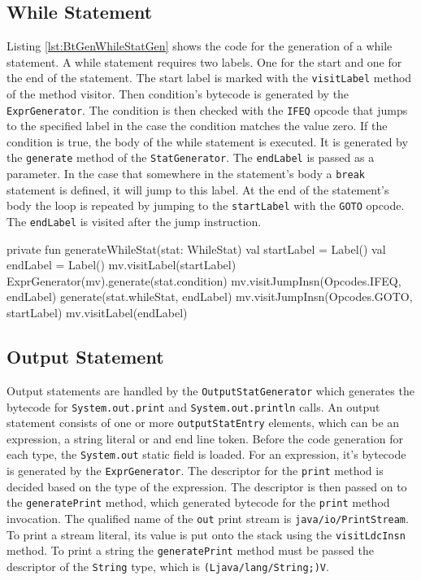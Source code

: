 \subsection{While Statement}

Listing \ref{lst:BtGenWhileStatGen} shows the code for the generation of a while statement. A while statement requires two labels. One for the start and one for the end of the statement. The start label is marked with the \verb|visitLabel| method of the method visitor. Then condition's bytecode is generated by the \verb|ExprGenerator|. The condition is then checked with the \verb|IFEQ| opcode that jumps to the specified label in the case the condition matches the value zero. If the condition is true, the body of the while statement is executed. It is generated by the \verb|generate| method of the \verb|StatGenerator|. The \verb|endLabel| is passed as a parameter. In the case that somewhere in the statement's body a \verb|break| statement is defined, it will jump to this label. At the end of the statement's body the loop is repeated by jumping to the \verb|startLabel| with the \verb|GOTO| opcode. The \verb|endLabel| is visited after the jump instruction. 


\begin{KotlinCode}[float,numbers=none,caption=Implementation of the \texttt{generateInputStat} method of the \texttt{StatGenerator}., label=lst:BtGenWhileStatGen]
private fun generateWhileStat(stat: WhileStat) {
    val startLabel = Label()
    val endLabel = Label()
    mv.visitLabel(startLabel)
    ExprGenerator(mv).generate(stat.condition)
    mv.visitJumpInsn(Opcodes.IFEQ, endLabel)
    generate(stat.whileStat, endLabel)
    mv.visitJumpInsn(Opcodes.GOTO, startLabel)
    mv.visitLabel(endLabel)
}
    \end{KotlinCode}

\subsection{Output Statement}

Output statements are handled by the \verb|OutputStatGenerator| which generates the bytecode for \verb|System.out.print| and \verb|System.out.println| calls. An output statement consists of one or more \verb|outputStatEntry| elements, which can be an expression, a string literal or and end line token. Before the code generation for each type, the \verb|System.out| static field is loaded. For an expression, it's bytecode is generated by the \verb|ExprGenerator|. The descriptor for the \verb|print| method is decided based on the type of the expression. The descriptor is then passed on to the \verb|generatePrint| method, which generated bytecode for the \verb|print| method invocation. The qualified name of the \verb|out| print stream is \texttt{java/io/PrintStream}. To print a stream literal, its value is put onto the stack using the \verb|visitLdcInsn| method. To print a string the \verb|generatePrint| method must be passed the descriptor of the \verb|String| type, which is \texttt{(Ljava/lang/String;)V}. 


